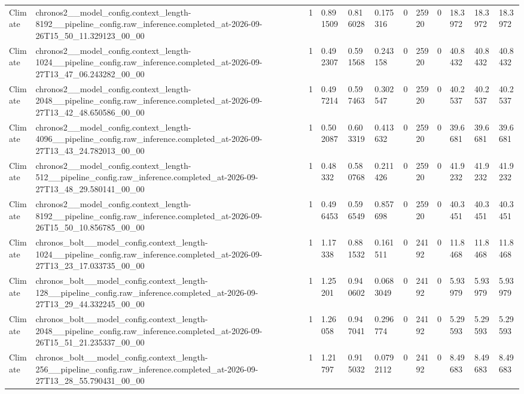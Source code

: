 \begin{tabular}{llllllllllll}
Climate & chronos2\_\_model\_config.context\_length-8192\_\_pipeline\_config.raw\_inference.completed\_at-2026-09-26T15\_50\_11.329123\_00\_00 & 1 & 0.891509 & 0.816028 & 0.175316 & 0 & 25920 & 0 & 18.3972 & 18.3972 & 18.3972 \\
Climate & chronos2\_\_model\_config.context\_length-1024\_\_pipeline\_config.raw\_inference.completed\_at-2026-09-27T13\_47\_06.243282\_00\_00 & 1 & 0.492307 & 0.591568 & 0.243158 & 0 & 25920 & 0 & 40.8432 & 40.8432 & 40.8432 \\
Climate & chronos2\_\_model\_config.context\_length-2048\_\_pipeline\_config.raw\_inference.completed\_at-2026-09-27T13\_42\_48.650586\_00\_00 & 1 & 0.497214 & 0.597463 & 0.302547 & 0 & 25920 & 0 & 40.2537 & 40.2537 & 40.2537 \\
Climate & chronos2\_\_model\_config.context\_length-4096\_\_pipeline\_config.raw\_inference.completed\_at-2026-09-27T13\_43\_24.782013\_00\_00 & 1 & 0.502087 & 0.603319 & 0.413632 & 0 & 25920 & 0 & 39.6681 & 39.6681 & 39.6681 \\
Climate & chronos2\_\_model\_config.context\_length-512\_\_pipeline\_config.raw\_inference.completed\_at-2026-09-27T13\_48\_29.580141\_00\_00 & 1 & 0.48332 & 0.580768 & 0.211426 & 0 & 25920 & 0 & 41.9232 & 41.9232 & 41.9232 \\
Climate & chronos2\_\_model\_config.context\_length-8192\_\_pipeline\_config.raw\_inference.completed\_at-2026-09-26T15\_50\_10.856785\_00\_00 & 1 & 0.496453 & 0.596549 & 0.857698 & 0 & 25920 & 0 & 40.3451 & 40.3451 & 40.3451 \\
Climate & chronos\_bolt\_\_model\_config.context\_length-1024\_\_pipeline\_config.raw\_inference.completed\_at-2026-09-27T13\_23\_17.033735\_00\_00 & 1 & 1.17338 & 0.881532 & 0.161511 & 0 & 24192 & 0 & 11.8468 & 11.8468 & 11.8468 \\
Climate & chronos\_bolt\_\_model\_config.context\_length-128\_\_pipeline\_config.raw\_inference.completed\_at-2026-09-27T13\_29\_44.332245\_00\_00 & 1 & 1.25201 & 0.940602 & 0.0683049 & 0 & 24192 & 0 & 5.93979 & 5.93979 & 5.93979 \\
Climate & chronos\_bolt\_\_model\_config.context\_length-2048\_\_pipeline\_config.raw\_inference.completed\_at-2026-09-26T15\_51\_21.235337\_00\_00 & 1 & 1.26058 & 0.947041 & 0.296774 & 0 & 24192 & 0 & 5.29593 & 5.29593 & 5.29593 \\
Climate & chronos\_bolt\_\_model\_config.context\_length-256\_\_pipeline\_config.raw\_inference.completed\_at-2026-09-27T13\_28\_55.790431\_00\_00 & 1 & 1.21797 & 0.915032 & 0.0792112 & 0 & 24192 & 0 & 8.49683 & 8.49683 & 8.49683 \\

\end{tabular}
